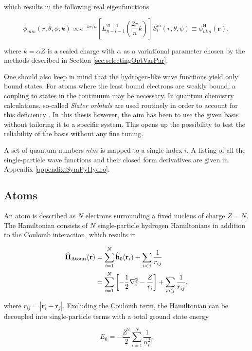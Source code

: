 which results in the following real eigenfunctions

\begin{equation}
  \phi_{nlm}(r, \theta, \phi; k) \propto e^{-kr/n}\left[L_{n-l-1}^{2l+1}\left(\frac{2r}{n}k\right)\right] S_l^m(r, \theta, \phi) \equiv \phi^\mathrm{H}_{nlm}(\mathbf{r}), \label{eq:hydrogenBasisReal}
\end{equation}

where $k = \alpha Z$ is a scaled charge with $\alpha$ as a variational parameter chosen by the methods described in Section \ref{sec:selectingOptVarPar}.

One should also keep in mind that the hydrogen-like wave functions yield only bound states. For atoms where the least bound electrons are weakly bound, a coupling to states in the continuum may be necessary.
In quantum chemistry calculations, so-called \textit{Slater orbitals} are used routinely in order to account for this deficiency \cite{Helgaker}. In this thesis however, the aim has been to use the given basis without tailoring it to a specific system. This opens up the possibility to test the reliability of the basis without any fine tuning.

A set of quantum numbers $nlm$ is mapped to a single index $i$. A listing of all the single-particle wave functions and their closed form derivatives are given in Appendix \ref{appendix:SymPyHydro}.

\subsection{Atoms}

An atom is described as $N$ electrons surrounding a fixed nucleus of charge $Z=N$. The Hamiltonian consists of $N$ single-particle hydrogen Hamiltonians in addition to the Coulomb interaction, which results in

\begin{align}
 {\bf\widehat{H}}_{\mathrm{Atoms}}(\mathbf{r}) &= \sum_{i=1}^N {\bf\widehat{h}}_0(\mathbf{r}_i) + \sum_{i<j} \frac{1}{r_{ij}} \\
                         &= \sum_{i=1}^N \left[-\frac{1}{2}\nabla_i^2 - \frac{Z}{r_i}\right] + \sum_{i<j} \frac{1}{r_{ij}},
\end{align}

where $r_{ij} = |\mathbf{r}_i -\mathbf{r}_j|$. Excluding the Coulomb term, the Hamiltonian can be decoupled into single-particle terms with a total ground state energy

\begin{equation}
 E_0 = -\frac{Z^2}{2}\sum_{i=1}^N \frac{1}{n_i^2}. \label{eq:atomsE0}
\end{equation}

